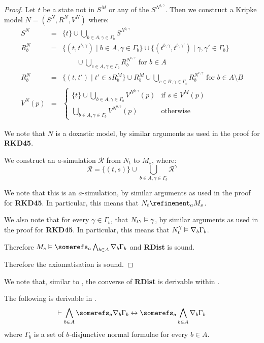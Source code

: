 \begin{proof}
Let $t$ be a state not in $S^M$ or any of the $S^{N^{b,\gamma}}$. Then we
construct a Kripke model $N = (S^N, R^N, V^N)$ where:
\begin{eqnarray*}
S^N &=& \{t\} \cup \bigcup_{b \in A, \gamma \in \Gamma_b} S^{N^{b,\gamma}}\\
R^N_b &=& \{(t, t^{b,\gamma}) \mid b \in A, \gamma \in \Gamma_b\} 
\cup \{(t^{b,\gamma}, t^{b,\gamma'}) \mid \gamma, \gamma' \in \Gamma_b\}\\
&&\qquad \cup \bigcup_{c \in A, \gamma \in \Gamma_b} R^{N^{c,\gamma}}_b \text{ for $b \in A$}\\
R^N_b &=& \{(t, t') \mid t' \in sR^M_b\} \cup R^M_b \cup
\bigcup_{c \in B, \gamma \in \Gamma_c} R^{N^{c,\gamma}}_b \text{ for $b \in A
\setminus B$}\\
V^N(p) &=& 
\begin{cases}
\displaystyle \{t\} \cup \bigcup_{b \in A, \gamma \in \Gamma_b} V^{N^{b,\gamma}}(p)
& \text{if $s \in V^M(p)$}\\
\displaystyle \bigcup_{b \in A, \gamma \in \Gamma_b} V^{N^{b,\gamma}}(p) &
\text{otherwise}
\end{cases}
\end{eqnarray*}

We note that $N$ is a doxastic model, by similar arguments as used in the proof
for {\bf RKD45}.

We construct an $a$-simulation $\mathcal{R}$ from $N_t$ to $M_s$, where:
$$\mathcal{R} = \{(t, s)\} \cup \bigcup_{b \in A, \gamma \in \Gamma_b}
\mathcal{R}^\gamma$$

We note that this is an $a$-simulation, by similar arguments as used in the
proof for {\bf RKD45}. In particular, this means that $N_t \refinement_a M_s$.

We also note that for every $\gamma \in \Gamma_b$, that $N_{t^\gamma} \vDash
\gamma$, by similar arguments as used in the proof for {\bf RKD45}. In
particular, this means that $N^\gamma_t \vDash \nabla_b \Gamma_b$.

Therefore $M_s \entails \somerefs_a \bigwedge_{b \in A} \covers_b \Gamma_b$ and
{\bf RDist} is sound.

Therefore the axiomatisation \axiomKDF{} is sound.
\end{proof}

We note that, similar to \axiomKF{}, the converse of {\bf RDist} is derivable
within \axiomKDF{}.

\begin{lemma}\label{kd45-rdist-converse}
The following is derivable in \axiomKDF{}.
$$
\proves \bigwedge_{b \in A} \somerefs_a \covers_b \Gamma_b \iff
\somerefs_a \bigwedge_{b \in A} \covers_b \Gamma_b \\
$$
where $\Gamma_b$ is a set of $b$-disjunctive normal formulae for
every $b \in A$.
\end{lemma}

